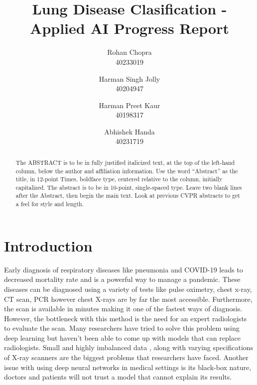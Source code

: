 \documentclass[10pt,twocolumn,letterpaper]{article}
\def\subName{Applied AI }
\begin{document}
\def\cvprPaperID{Group-Q} %
\def\confName{COMP6721}
\def\confYear{2022}

\title{Lung Disease Clasification - \subName Progress Report}
\author{Rohan Chopra\\
\small 40233019\\
\and
Harman Singh Jolly\\
\small 40204947\\
\and
Harman Preet Kaur\\
\small 40198317\\
\and
Abhishek Handa\\
\small 40231719\\
}
\maketitle

\begin{abstract}
  The ABSTRACT is to be in fully justified italicized text, at the top of the left-hand column, below the author and affiliation information.
  Use the word ``Abstract'' as the title, in 12-point Times, boldface type, centered relative to the column, initially capitalized.
  The abstract is to be in 10-point, single-spaced type.
  Leave two blank lines after the Abstract, then begin the main text.
  Look at previous CVPR abstracts to get a feel for style and length.
\end{abstract}

\section{Introduction}
\label{sec:intro}

Early diagnosis of respiratory diseases like pneumonia and COVID-19 leads to decreased mortality rate \cite{daniel2016time} and is a powerful way to manage a pandemic\cite{xu2020facile}. These diseases can be diagnosed using a variety of tests like pulse oximetry, chest x-ray, CT scan\cite{mattsmith2022},  PCR\cite{akhtar1996pcr} however chest X-rays are by far the most accessible\cite{frija2021improve}. Furthermore, the scan is available in minutes making it one of the fastest ways of diagnosis\cite{healthwise2021}. However, the bottleneck with this method is the need for an expert radiologists to evaluate the scan\cite{mehrotra2009radiologists}. Many researchers have tried to solve this problem using deep learning \cite{wang2021deep} but haven't been able to come up with models that can replace radiologists. Small \cite{guefrechi2021deep} and highly imbalanced data \cite{wang2021deep}, along with varying specifications of X-ray scanners are the biggest problems \cite{melissarohman2018} that researchers have faced. Another issue with using deep neural networks in medical settings is its black-box nature\cite{paulblazek2022}, doctors and patients will not trust a model that cannot explain its results\cite{aleksandra2019}. 
\end{document}
